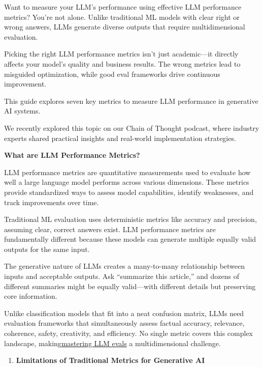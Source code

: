 \documentclass[
  letterpaper,
  DIV=11,
  numbers=noendperiod,
  oneside]{scrreprt}
\providecommand{\tightlist}{%
  \setlength{\itemsep}{0pt}\setlength{\parskip}{0pt}}
\begin{document}
\begin{tcolorbox}
Want to measure your LLM's performance using effective LLM performance
metrics? You're not alone. Unlike traditional ML models with clear right
or wrong answers, LLMs generate diverse outputs that require
multidimensional evaluation.

Picking the right LLM performance metrics isn't just academic---it
directly affects your model's quality and business results. The wrong
metrics lead to misguided optimization, while good eval frameworks drive
continuous improvement.

This guide explores seven key metrics to measure LLM performance in
generative AI systems.

We recently explored this topic on our Chain of Thought podcast, where
industry experts shared practical insights and real-world implementation
strategies.

\textbf{What are LLM Performance Metrics?}

LLM performance metrics are quantitative measurements used to evaluate
how well a large language model performs across various dimensions.
These metrics provide standardized ways to assess model capabilities,
identify weaknesses, and track improvements over time.

Traditional ML evaluation uses deterministic metrics like accuracy and
precision, assuming clear, correct answers exist. LLM performance
metrics are fundamentally different because these models can generate
multiple equally valid outputs for the same input.

The generative nature of LLMs creates a many-to-many relationship
between inputs and acceptable outputs. Ask ``summarize this article,''
and dozens of different summaries might be equally valid---with
different details but preserving core information.

Unlike classification models that fit into a neat confusion matrix, LLMs
need evaluation frameworks that simultaneously assess factual accuracy,
relevance, coherence, safety, creativity, and efficiency. No single
metric covers this complex landscape,
making\href{https://www.galileo.ai/blog/mastering-llm-evaluation-metrics-frameworks-and-techniques}{mastering
LLM evals} a multidimensional challenge.

\begin{enumerate}
\def\labelenumi{\arabic{enumi}.}
\tightlist
\item
  \textbf{Limitations of Traditional Metrics for Generative AI}
\end{enumerate}


\end{tcolorbox}
\end{document}
